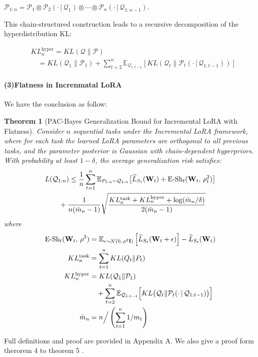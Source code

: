 \documentclass[letterpaper]{article} %
\newtheorem{theorem}{Theorem}
\begin{document}
$\mathcal{P}_{1:n} = \mathcal{P}_1 \otimes \mathcal{P}_2(\cdot\,|\,\mathcal{Q}_1) \otimes \cdots \otimes \mathcal{P}_n(\cdot\,|\,\mathcal{Q}_{1:n-1}).$

This chain-structured construction leads to a recursive decomposition of the hyperdistribution KL:

$$  
\begin{aligned}
    &KL^{\text{hyper}}_n = KL(\mathcal{Q} \| \mathcal{P})  \\
    & \quad =KL(\mathcal{Q}_1 \| \mathcal{P}_1)  +\sum_{t=2}^n \mathbb{E}_{\mathcal{Q}_{1:t-1}}\left[        KL(\mathcal{Q}_t \| \mathcal{P}_t(\cdot\,|\,\mathcal{Q}_{1:t-1}))    \right]
\end{aligned}
$$


\paragraph{(3)Flatness in Increnmatal LoRA}






We have the conclusion as follow: 
\begin{theorem}[PAC-Bayes Generalization Bound for Incremental LoRA with Flatness]
Consider $n$ sequential tasks under the Incremental LoRA framework, where for each task the learned LoRA parameters are orthogonal to all previous tasks, and the parameter posterior is Gaussian with chain-dependent hyperpriors. With probability at least $1-\delta$, the average generalization risk satisfies:
\begin{align}
      &  L(\mathcal{Q}_{1:n}) \leq  \frac{1}{n} \sum_{t=1}^{n}
        \mathbb{E}_{P_{1:n} \sim \mathcal{Q}_{1:n}}\big[
            \widehat{L}_{S_t}(\mathbf{W}_{t}) \notag
 + \text{E-Sh}_t(\mathbf{W}_{t} ,\, \rho_t^2)
        \big] \notag\\
&  \qquad + \frac{1 }{n(\bar{m}_n - 1)}\sqrt{
            \frac{KL_{n}^{\text{task}} + KL_{n}^{\text{hyper}} +\log(\bar{m}_{n}/\delta)}{2(\bar{m}_{n} - 1)}
        }
\end{align}
where
\begin{align}
\text{E-Sh}_t(\mathbf{W}_{t},\, \rho^2) 
    &= \mathbb{E}_{\epsilon \sim \mathcal{N}(0,\, \rho^2 \mathbf{I})} 
        \left[
            \widehat{L}_{S_t}(\mathbf{W}_{t}  + \epsilon)
        \right] 
        - \widehat{L}_{S_t}(\mathbf{W}_{t} ) \notag\\
KL^{\text{task}}_n &= \sum_{t=1}^n KL(Q_t \| P_t) \notag \\
KL^{\text{hyper}}_n &= KL(\mathcal{Q}_1 \| \mathcal{P}_1) \notag \\
   &\quad + \sum_{t=2}^n 
        \mathbb{E}_{\mathcal{Q}_{1:t-1}} \Big[
            KL\big(\mathcal{Q}_t \| \mathcal{P}_t(\cdot\,|\,\mathcal{Q}_{1:t-1})\big)
        \Big] \notag\\
\bar{m}_n &= n \Big/ \left(\sum_{t=1}^n 1/m_t\right) \notag
\end{align}
\end{theorem}
Full definitions and proof are provided in Appendix A. We also give a proof form therorem 4 to theorem 5 .
\end{document}

